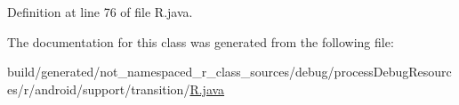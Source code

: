 Definition at line 76 of file R.\+java.



The documentation for this class was generated from the following file\+:\begin{DoxyCompactItemize}
\item 
build/generated/not\+\_\+namespaced\+\_\+r\+\_\+class\+\_\+sources/debug/process\+Debug\+Resources/r/android/support/transition/\mbox{\hyperlink{android_2support_2transition_2_r_8java}{R.\+java}}\end{DoxyCompactItemize}
